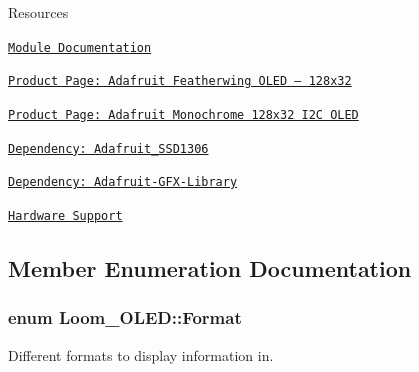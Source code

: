 \begin{DoxyParagraph}{Resources}

\begin{DoxyItemize}
\item \href{https://openslab-osu.github.io/Loom/html/class_loom___o_l_e_d.html}{\tt Module Documentation}
\item \href{https://www.adafruit.com/product/2900}{\tt Product Page\+: Adafruit Featherwing O\+L\+ED – 128x32}
\item \href{https://www.adafruit.com/product/2927}{\tt Product Page\+: Adafruit Monochrome 128x32 I2C O\+L\+ED}
\item \href{https://github.com/adafruit/Adafruit_SSD1306}{\tt Dependency\+: Adafruit\+\_\+\+S\+S\+D1306}
\item \href{https://github.com/adafruit/Adafruit-GFX-Library}{\tt Dependency\+: Adafruit-\/\+G\+F\+X-\/\+Library}
\item \href{https://github.com/OPEnSLab-OSU/Loom/wiki/Hardware-Support#oled-display}{\tt Hardware Support} 
\end{DoxyItemize}
\end{DoxyParagraph}


\subsection{Member Enumeration Documentation}
\subsubsection[{\texorpdfstring{Format}{Format}}]{\setlength{\rightskip}{0pt plus 5cm}enum {\bf Loom\+\_\+\+O\+L\+E\+D\+::\+Format}\hspace{0.3cm}{\ttfamily [strong]}}\hypertarget{class_loom___o_l_e_d_aade282dab7eb118271f73b3b3bfc0ffd}{}\label{class_loom___o_l_e_d_aade282dab7eb118271f73b3b3bfc0ffd}


Different formats to display information in. 

